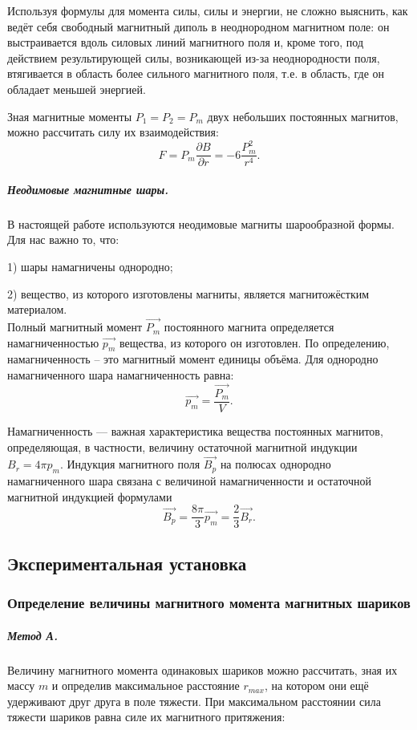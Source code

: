 \documentclass[12pt,a4paper]{article}
\begin{document}
Используя формулы для момента силы, силы и энергии, не сложно выяснить, как ведёт себя свободный магнитный диполь в неоднородном магнитном поле: 
он выстраивается вдоль силовых линий магнитного поля и, кроме того, под действием результирующей силы, возникающей из-за неоднородности поля, 
втягивается в область более сильного магнитного поля, т.е. в область, где он обладает меньшей энергией.

Зная магнитные моменты $P_1 = P_2 = P_m$ двух небольших постоянных магнитов, можно рассчитать силу их взаимодействия:
\[
F = P_m \dfrac{\partial B}{\partial r}=-6\dfrac{P_m^2}{r^4}.
\]

\subparagraph*{Неодимовые магнитные шары.}
В настоящей работе используются неодимовые магниты шарообразной формы.
Для нас важно то, что:

1) шары намагничены однородно;

2) вещество, из которого изготовлены магниты, является магнитожёстким материалом.\\

Полный магнитный момент $\overrightarrow{P_m}$ постоянного магнита определяется намагниченностью $\overrightarrow{p_m}$ вещества, из которого он изготовлен. 
По определению, намагниченность – это магнитный момент единицы объёма. 
Для однородно намагниченного шара намагниченность равна:
\[
\overrightarrow{p_m}=\dfrac{\overrightarrow{P_m}}{V}.
\]
 
Намагниченность — важная характеристика вещества постоянных магнитов, определяющая, в частности, величину остаточной магнитной индукции $B_r = 4\pi p_m$. 
Индукция магнитного поля $\overrightarrow{B_p}$ на полюсах однородно намагниченного шара связана с величиной намагниченности и остаточной магнитной индукцией формулами
\[
\overrightarrow{B_p}=\dfrac{8\pi}{3}\overrightarrow{p_m}=\dfrac{2}{3}\overrightarrow{B_r}.
\]

\subsection*{Экспериментальная установка}

\subsubsection*{Определение величины магнитного момента магнитных шариков}

\subparagraph*{Метод А.}
Величину магнитного момента одинаковых шариков можно рассчитать, зная их массу $m$ и определив максимальное расстояние $r_{max}$, на котором они ещё удерживают друг
друга в поле тяжести. При максимальном расстоянии сила тяжести шариков равна силе их магнитного притяжения:
\end{document}
